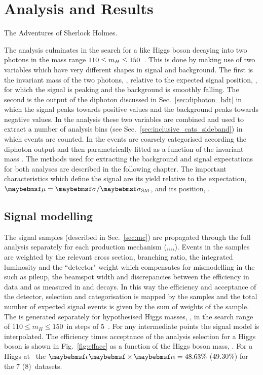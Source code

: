 \chapter{Analysis and Results}
\label{chap:analysis}
{The Adventures of Sherlock Holmes.}

The analysis culminates in the search for a \SM like Higgs boson decaying into two photons in the mass range $110\leq m_{H}\leq 150$~\GeV. This is done by making use of two variables which have very different shapes in signal and background. The first is the invariant mass of the two photons, \mgg, relative to the expected signal position, \mH, for which the signal is peaking and the background is smoothly falling. The second is the output of the diphoton \BDT discussed in Sec.~\ref{sec:diphoton_bdt} in which the signal peaks towards positive values and the background peaks towards negative values. In the \SMVA analysis these two variables are combined and used to extract a number of analysis bins (see Sec.~\ref{sec:inclusive_cats_sideband}) in which events are counted. In the \MFM events are coarsely categorised according the diphoton \BDT output and then parametrically fitted as a function of the invariant mass \mgg. The methods used for extracting the background and signal expectations for both analyses are described in the following chapter. The important characteristics which define the signal are its yield relative to the \SM expectation, $\mu=\musm$, and its position, \mH.

\section{Signal modelling}
\label{sec:signal_model}

The signal \MC samples (described in Sec.~\ref{sec:mc}) are propagated through the full analysis separately for each production mechanism (\ggH,\VBF,\WH,\ZH,\ttH). Events in the samples are weighted by the relevant \SM cross section, branching ratio, the integrated luminosity and the ``detector" weight which compensates for mismodelling in the \MC such as pileup, the beamspot width and discrepancies between the efficiency in data and \MC as measured in \Zee and \Zmumugamma decays. In this way the efficiency and acceptance of the detector, selection and categorisation is mapped by the \MC samples and the total number of expected \SM signal events is given by the sum of weights of the sample. The \MC is generated separately for hypothesised Higgs masses, \mH, in the search range of $110 \leq m_{H} \leq 150$~\GeV in steps of 5~\GeV. For any intermediate points the signal model is interpolated. The efficiency times acceptance of the analysis selection for a \SM Higgs boson is shown in Fig.~\ref{fig:effacc} as a function of the Higgs boson mass, \mH. For a Higgs at ~\GeV the $\ea=48.63\%$ (49.30\%) for the 7 (8)~\TeV datasets.

